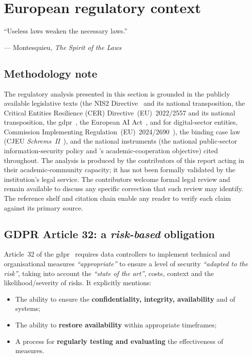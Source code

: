 \section{European regulatory context}
\label{sec:reglementation}

\epigraph{``Useless laws weaken the necessary laws.''}{--- Montesquieu, \textit{The Spirit of the Laws}~\cite{montesquieu1748}}

\subsection*{Methodology note}

The regulatory analysis presented in this section is grounded in
the publicly available legislative texts (the NIS2
Directive~\cite{nis2} and its national transposition, the
Critical Entities Resilience (CER) Directive~(EU)~2022/2557 and
its national transposition, the
\gls{gdpr}~\cite{gdpr}, the European AI Act~\cite{eu-ai-act}, and
for digital-sector entities, Commission Implementing
Regulation~(EU)~2024/2690~\cite{eu-regulation-2024-2690}),
the binding case law (CJEU \emph{Schrems~II}~\cite{schrems2020}),
and the national instruments (the national public-sector
information-security policy and 's
academic-cooperation objective) cited throughout. The
analysis is produced by the contributors of this report acting in
their academic-community capacity; it has not been formally
validated by the institution's legal service. The contributors
welcome formal legal review and remain available to discuss any
specific correction that such review may identify. The reference
shelf and citation chain enable any reader to verify each claim
against its primary source.

\subsection{GDPR Article 32: a \emph{risk-based} obligation}

Article~32 of the \gls{gdpr}~\cite{gdpr} requires data controllers
to implement technical and organisational measures
\emph{``appropriate''} to ensure a level of security \emph{``adapted
to the risk''}, taking into account the \emph{``state of the art''}, costs,
context and the likelihood/severity of risks. It explicitly
mentions:

\begin{itemize}[nosep]
    \item The ability to ensure the \textbf{confidentiality, integrity,
    availability} and  of systems;
    \item The ability to \textbf{restore availability} within
    appropriate timeframes;
    \item A process for \textbf{regularly testing and evaluating}
    the effectiveness of measures.
\end{itemize}

